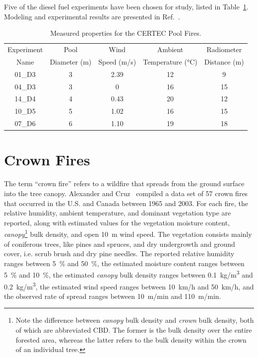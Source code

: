 Five of the diesel fuel experiments have been chosen for study, listed in Table~\ref{CERTEC_Parameters}. Modeling and experimental results are presented in Ref.~\cite{Rengel:JLP2018}.

\begin{table}[ht]
\centering
\caption[Measured properties for the CERTEC Pool Fires]{Measured properties for the CERTEC Pool Fires.}
\label{CERTEC_Parameters}
\begin{tabular}{|c|c|c|c|c|}
\hline
Experiment       & Pool          & Wind            & Ambient                              & Radiometer   \\                 
Name             & Diameter (m)  & Speed (m/s)     & Temperature (\unit{\degreeCelsius})  & Distance (m) \\ \hline \hline
01\_D3           & 3             & 2.39            & 12                                   & 9            \\ \hline
04\_D3           & 3             & 0               & 16                                   & 15           \\ \hline
14\_D4           & 4             & 0.43            & 20                                   & 12           \\ \hline
10\_D5           & 5             & 1.02            & 16                                   & 15           \\ \hline
07\_D6           & 6             & 1.10            & 19                                   & 18           \\ \hline
\end{tabular}
\end{table}


\section{Crown Fires}
\label{Crown_Fires_Description}

The term ``crown fire'' refers to a wildfire that spreads from the ground surface into the tree canopy. Alexander and Cruz~\cite{Alexander:CJFR2006} compiled a data set of 57 crown fires that occurred in the U.S. and Canada between 1965 and 2003. For each fire, the relative humidity, ambient temperature, and dominant vegetation type are reported, along with estimated values for the vegetation moisture content, {\em canopy}\footnote{Note the difference between {\em canopy} bulk density and {\em crown} bulk density, both of which are abbreviated CBD. The former is the bulk density over the entire forested area, whereas the latter refers to the bulk density within the crown of an individual tree.} bulk density, and open 10~m wind speed. The vegetation consists mainly of coniferous trees, like pines and spruces, and dry undergrowth and ground cover, i.e. scrub brush and dry pine needles. The reported relative humidity ranges between 5~\% and 50~\%, the estimated moisture content ranges between 5~\% and 10~\%, the estimated {\em canopy} bulk density ranges between 0.1~\unit{kg/m^3} and 0.2~\unit{kg/m^3}, the estimated wind speed ranges between 10~km/h and 50~km/h, and the observed rate of spread ranges between 10~m/min and 110~m/min.

